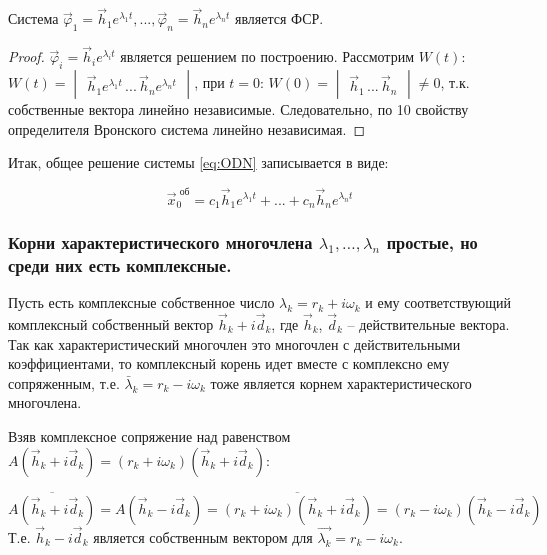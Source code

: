 \begin{lemma}
Система $\vec{\varphi}_1 = \vec{h}_1 e^{\lambda_1 t}, ..., \vec{\varphi}_n = \vec{h}_n e^{\lambda_n t}$ является ФСР. 
\end{lemma}

\begin{proof}
  $\vec{\varphi}_i = \vec{h}_i e^{\lambda_i t}$ является решением по построению. Рассмотрим $W(t)$: $W(t) = \begin{vmatrix*} \vec{h}_1 e^{\lambda_1 t} \,...\, \vec{h}_n e^{\lambda_n t}\end{vmatrix*}$, 
  при $t = 0$: $W(0) = \begin{vmatrix*} \vec{h}_1 \, ... \, \vec{h}_n \end{vmatrix*} \neq 0$, т.к. собственные вектора линейно независимые. 
  Следовательно, по 10 свойству определителя Вронского система линейно независимая.
\end{proof}

Итак, общее решение системы \eqref{eq:ODN} записывается в виде: 

\begin{equation*}
  \boxed{\vec{x}^{\text{ об}}_0 = c_1 \vec{h}_1 e^{\lambda_1 t} + ... + c_n \vec{h}_n e^{\lambda_n t}}
\end{equation*}

\subsubsection*{Корни характеристического многочлена $\lambda_1, \dots, \lambda_n$ простые, но среди них есть комплексные.}
Пусть есть комплексные собственное число $\lambda_k = r_k + i \omega_k$ и ему соответствующий комплексный собственный вектор $\vec{h}_k + i \vec{d}_k $, 
где $\vec{h}_k$, $\vec{d}_k$ -- действительные вектора. Так как характеристический многочлен это многочлен с действительными коэффициентами, 
то комплексный корень идет вместе с комплексно ему сопряженным, т.е. $\bar{\lambda}_k = r_k - i \omega_k$ тоже является корнем характеристического многочлена. 

Взяв комплексное сопряжение над равенством $A (\vec{h}_k + i \vec{d}_k) = (r_k + i \omega_k)(\vec{h}_k + i \vec{d}_k)$:

\[ \overline{A (\vec{h}_k + i \vec{d}_k)} = A (\vec{h}_k - i \vec{d}_k) = \overline{(r_k + i \omega_k)(\vec{h}_k + i \vec{d}_k)} = (r_k - i \omega_k)(\vec{h}_k - i \vec{d}_k) \]
Т.е. $\vec{h}_k - i \vec{d}_k$ является собственным вектором для $\vec{\lambda_k} = r_k - i \omega_k$.

